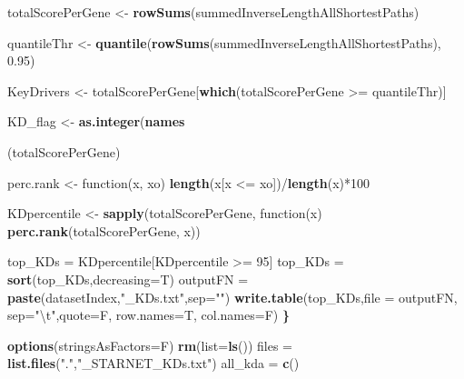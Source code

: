 \documentclass[]{article}
\newenvironment{Shaded}{\begin{snugshade}}{\end{snugshade}}
\newcommand{\KeywordTok}[1]{\textcolor[rgb]{0.13,0.29,0.53}{\textbf{{#1}}}}
\newcommand{\DataTypeTok}[1]{\textcolor[rgb]{0.13,0.29,0.53}{{#1}}}
\newcommand{\DecValTok}[1]{\textcolor[rgb]{0.00,0.00,0.81}{{#1}}}
\newcommand{\FloatTok}[1]{\textcolor[rgb]{0.00,0.00,0.81}{{#1}}}
\newcommand{\CharTok}[1]{\textcolor[rgb]{0.31,0.60,0.02}{{#1}}}
\newcommand{\StringTok}[1]{\textcolor[rgb]{0.31,0.60,0.02}{{#1}}}
\newcommand{\ErrorTok}[1]{\textcolor[rgb]{0.64,0.00,0.00}{\textbf{{#1}}}}
\newcommand{\NormalTok}[1]{{#1}}
\begin{document}
\begin{Shaded}
\begin{Highlighting}[]
  \NormalTok{totalScorePerGene <-}\StringTok{ }\KeywordTok{rowSums}\NormalTok{(summedInverseLengthAllShortestPaths)}
  
  \NormalTok{quantileThr <-}\StringTok{ }\KeywordTok{quantile}\NormalTok{(}\KeywordTok{rowSums}\NormalTok{(summedInverseLengthAllShortestPaths), }\FloatTok{0.95}\NormalTok{)}
  
  \NormalTok{KeyDrivers <-}\StringTok{ }\NormalTok{totalScorePerGene[}\KeywordTok{which}\NormalTok{(totalScorePerGene >=}\StringTok{ }\NormalTok{quantileThr)]}
  
  \NormalTok{KD_flag <-}\StringTok{ }\KeywordTok{as.integer}\NormalTok{(}\KeywordTok{names}\NormalTok{(totalScorePerGene) %in%}\StringTok{ }\KeywordTok{names}\NormalTok{(KeyDrivers))}
  
  \NormalTok{perc.rank <-}\StringTok{ }\NormalTok{function(x, xo)  }\KeywordTok{length}\NormalTok{(x[x <=}\StringTok{ }\NormalTok{xo])/}\KeywordTok{length}\NormalTok{(x)*}\DecValTok{100} 
  
  \NormalTok{KDpercentile <-}\StringTok{ }\KeywordTok{sapply}\NormalTok{(totalScorePerGene, function(x) }\KeywordTok{perc.rank}\NormalTok{(totalScorePerGene, x))}
  
  \NormalTok{top_KDs =}\StringTok{ }\NormalTok{KDpercentile[KDpercentile >=}\StringTok{ }\DecValTok{95}\NormalTok{]}
  \NormalTok{top_KDs =}\StringTok{ }\KeywordTok{sort}\NormalTok{(top_KDs,}\DataTypeTok{decreasing=}\NormalTok{T)}
  \NormalTok{outputFN =}\StringTok{ }\KeywordTok{paste}\NormalTok{(datasetIndex,}\StringTok{"_KDs.txt"}\NormalTok{,}\DataTypeTok{sep=}\StringTok{""}\NormalTok{)}
  \KeywordTok{write.table}\NormalTok{(top_KDs,}\DataTypeTok{file =} \NormalTok{outputFN, }\DataTypeTok{sep=}\StringTok{"}\CharTok{\textbackslash{}t}\StringTok{"}\NormalTok{,}\DataTypeTok{quote=}\NormalTok{F, }\DataTypeTok{row.names=}\NormalTok{T, }\DataTypeTok{col.names=}\NormalTok{F)}
\ErrorTok{\}}

\KeywordTok{options}\NormalTok{(}\DataTypeTok{stringsAsFactors=}\NormalTok{F)}
\KeywordTok{rm}\NormalTok{(}\DataTypeTok{list=}\KeywordTok{ls}\NormalTok{())}
\NormalTok{files =}\StringTok{ }\KeywordTok{list.files}\NormalTok{(}\StringTok{"."}\NormalTok{,}\StringTok{"_STARNET_KDs.txt"}\NormalTok{)}
\NormalTok{all_kda =}\StringTok{ }\KeywordTok{c}\NormalTok{()}

}
\end{Highlighting}
\end{Shaded}
\end{document}
